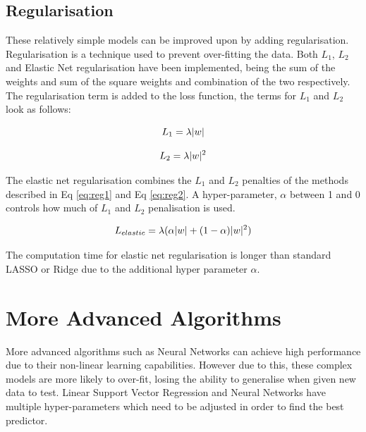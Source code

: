 \documentclass[10pt,twocolumn,letterpaper]{article}
\DeclarePairedDelimiter\abs{\lvert}{\rvert}%
\begin{document}
\subsection{Regularisation}
These relatively simple models can be improved upon by adding regularisation. Regularisation is a technique used to prevent over-fitting the data. Both $L_1$, $L_2$ and Elastic Net regularisation have been implemented, being the sum of the weights and sum of the square weights and combination of the two respectively. The regularisation term is added to the loss function, the terms for $L_1$ and $L_2$ look as follows:

\begin{center}
\noindent\begin{minipage}{.5\linewidth}
	\begin{equation}
	L_1 = \lambda  \abs{w}
	\label{eq:reg1}
	\end{equation}
\end{minipage}%
\begin{minipage}{.5\linewidth}
	\begin{equation}
	L_2 = \lambda  \abs{w}^2
	\label{eq:reg2}
	\end{equation}
\end{minipage}
\end{center}

The elastic net regularisation combines the $L_1$ and $L_2$ penalties of the methods described in Eq \ref{eq:reg1} and Eq \ref{eq:reg2}. A hyper-parameter, $\alpha$ between 1 and 0 controls how much of $L_1$ and $L_2$ penalisation is used.

\begin{equation}
L_{elastic} =  \lambda (\alpha\abs{w} + (1-\alpha)\abs{w}^2)
\label{eq:elastic}
\end{equation}

The computation time for elastic net regularisation is longer than standard LASSO or Ridge due to the additional hyper parameter $\alpha$. 

\section{More Advanced Algorithms}
More advanced algorithms such as Neural Networks can achieve high performance due to their non-linear learning capabilities. However due to this, these complex models are more likely to over-fit, losing the ability to generalise when given new data to test. Linear Support Vector Regression and Neural Networks have multiple hyper-parameters which need to be adjusted in order to find the best predictor.
\end{document}
